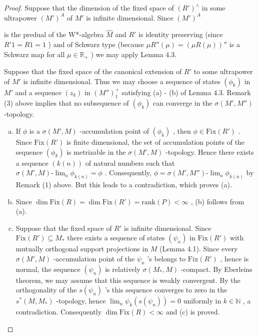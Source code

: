 \begin{proof}
Suppose that the dimension of the fixed space of $ (R')^{\wedge} $  in some ultrapower $ (M')^{A} $  of $ M' $  is infinite dimensional.
Since $ (M')^{A} $ 

\newpage

is the predual of the W*-algebra $ \hat{M} $  and $ R' $  is identity preserving (since $ R'1 = R1 = 1 $ ) and of Schwarz type (because $ \mu R''(\mu) = (\mu R(\mu))'' $  is a Schwarz map for all $ \mu \in \mathbb{R}_{+} $ ) we may apply Lemma 4.3.

Suppose that the fixed space of the canonical extension of $ R' $  to some ultrapower of $ M' $  is infinite dimensional.
Thus we may choose a sequence of states $ (\phi_{k}) $  in $ M' $  and a sequence $ (z_{k}) $  in $ (M'')_{1}^{+} $  satisfying (a) - (b) of Lemma 4.3.
Remark (3) above implies that no subsequence of $ (\phi_{k}) $  can converge in the $ \sigma(M',M'') $ -topology.

\begin{enumerate}[(a)]
\item
If $ \phi $  is a $ \sigma(M',M) $ -accumulation point of $ (\phi_{k}) $ , then $ \phi \in \text{Fix}(R') $ .
Since $ \text{Fix}(R') $  is finite dimensional, the set of accumulation points of the sequence $ (\phi_{k}) $  is metrizable in the $ \sigma(M',M) $ -topology.
Hence there exists a sequence $ (k(n)) $  of natural numbers such that $ \sigma(M',M)\text{-}\lim_{n} \phi_{k(n)} = \phi $ .
Consequently, $ \phi = \sigma(M',M'')\text{-}\lim_{n} \phi_{k(n)} $  by Remark (1) above.
But this leads to a contradiction, which proves (a).

\item
Since $ \dim \text{Fix}(R) = \dim \text{Fix}(R') = \text{rank}(P) < \infty $ , (b) follows from (a).

\item
Suppose that the fixed space of $ R' $  is infinite dimensional.
Since $ \text{Fix}(R') \subseteq M_{*} $  there exists a sequence of states $ (\psi_{n}) $  in $ \text{Fix}(R') $  with mutually orthogonal support projections in $ M $  (Lemma 4.1).
Since every $ \sigma(M',M) $ -accumulation point of the $ \psi_{n} $ 's belongs to $ \text{Fix}(R') $ , hence is normal, the sequence $ (\psi_{n}) $  is relatively $ \sigma(M_{*},M) $ -compact.
By Eberleins theorem, we may assume that this sequence is weakly convergent.
By the orthogonality of the $ s(\psi_{n}) $ 's this sequence converges to zero in the $ s^{*}(M,M_{*}) $ -topology, hence $ \lim_{n} \psi_{k}(s(\psi_{n})) = 0 $  uniformly in $ k \in \mathbb{N} $ , a contradiction.
Consequently $ \dim \text{Fix}(R) < \infty $  and (c) is proved.


\end{enumerate}
\end{proof}
